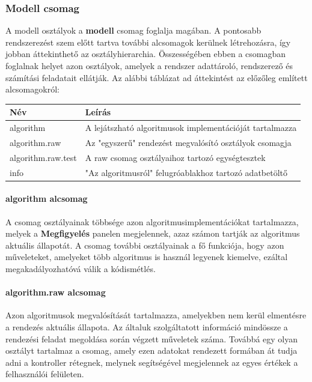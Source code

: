 \documentclass{elteikthesis}
\begin{document}
\subsubsection{Modell csomag}
A modell osztályok a \textbf{modell} csomag foglalja magában. A pontosabb rendszerezést szem előtt tartva további alcsomagok kerülnek létrehozásra, így jobban áttekinthető az osztályhierarchia. Összességében ebben a csomagban foglalnak helyet azon osztályok, amelyek a rendszer adattároló, rendszerező és számítási feladatait ellátják. Az alábbi táblázat ad áttekintést az előzőleg említett alcsomagokról:\par
\begin{table}[H]
	\def\arraystretch{2}
	\centering
	\begin{tabular}{|l|l|}
		\hline
		\textbf{Név}  & \textbf{Leírás}                                                                          \\ \hline
		algorithm     & A lejátszható algoritmusok implementációját tartalmazza                       \\ \hline
		algorithm.raw & Az "egyszerű" rendezést megvalósító osztályok csomagja\\ \hline
		algorithm.raw.test & A raw csomag osztályaihoz tartozó egységtesztek\\ \hline
		info         & "Az algoritmusról" felugróablakhoz tartozó adatbetöltő                         \\ \hline
	\end{tabular}
\end{table}
\paragraph{algorithm alcsomag}
A csomag osztályainak többsége azon algoritmusimplementációkat tartalmazza, melyek a \textbf{Megfigyelés} panelen megjelennek, azaz számon tartják az algoritmus aktuális állapotát. A csomag további osztályainak a fő funkciója, hogy azon műveleteket, amelyeket több algoritmus is használ legyenek kiemelve, ezáltal megakadályozhatóvá válik a kódismétlés.
\paragraph{algorithm.raw alcsomag}
Azon algoritmusok megvalósítását tartalmazza, amelyekben nem kerül elmentésre a rendezés aktuális állapota. Az általuk szolgáltatott információ mindössze a rendezési feladat megoldása során végzett műveletek száma. Továbbá egy olyan osztályt tartalmaz a csomag, amely ezen adatokat rendezett formában át tudja adni a kontroller rétegnek, melynek segítségével megjelennek az egyes értékek a felhasználói felületen.
\end{document}

